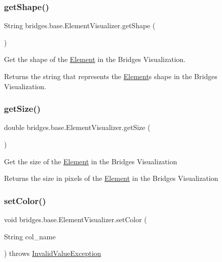 \subsubsection{\texorpdfstring{getShape()}{getShape()}}
{\footnotesize\ttfamily String bridges.\+base.\+Element\+Visualizer.\+get\+Shape (\begin{DoxyParamCaption}{ }\end{DoxyParamCaption})}

Get the shape of the \mbox{\hyperlink{classbridges_1_1base_1_1_element}{Element}} in the Bridges Visualization.

\begin{DoxyReturn}{Returns}
the string that represents the \mbox{\hyperlink{classbridges_1_1base_1_1_element}{Element}}\textquotesingle{}s shape in the Bridges Visualization. 
\end{DoxyReturn}
\mbox{\label{classbridges_1_1base_1_1_element_visualizer_a0b7673bf724e3df1f94df50ad95ca5b1}} 
\subsubsection{\texorpdfstring{getSize()}{getSize()}}
{\footnotesize\ttfamily double bridges.\+base.\+Element\+Visualizer.\+get\+Size (\begin{DoxyParamCaption}{ }\end{DoxyParamCaption})}

Get the size of the \mbox{\hyperlink{classbridges_1_1base_1_1_element}{Element}} in the Bridges Visualization

\begin{DoxyReturn}{Returns}
the size in pixels of the \mbox{\hyperlink{classbridges_1_1base_1_1_element}{Element}} in the Bridges Visualization 
\end{DoxyReturn}
\mbox{\label{classbridges_1_1base_1_1_element_visualizer_ad7ff2a772741301c08943a58ffccca38}} 
\subsubsection{\texorpdfstring{setColor()}{setColor()}\hspace{0.1cm}{\footnotesize\ttfamily [1/3]}}
{\footnotesize\ttfamily void bridges.\+base.\+Element\+Visualizer.\+set\+Color (\begin{DoxyParamCaption}\item[{String}]{col\+\_\+name }\end{DoxyParamCaption}) throws \mbox{\hyperlink{classbridges_1_1validation_1_1_invalid_value_exception}{Invalid\+Value\+Exception}}}



